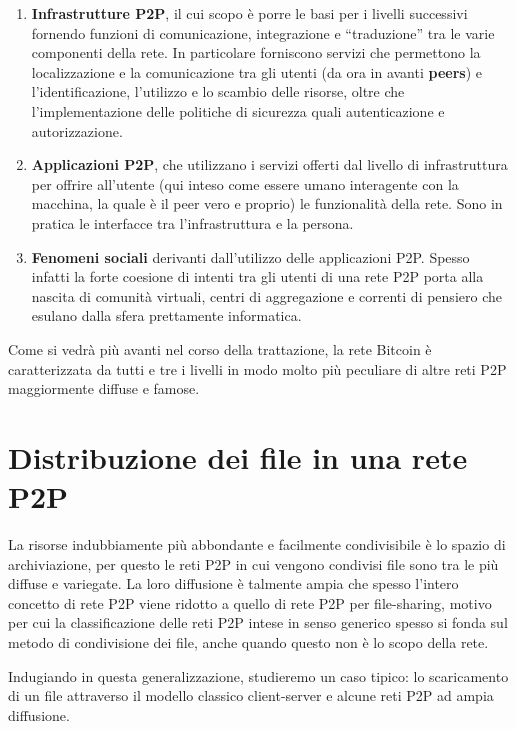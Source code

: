\begin{enumerate}
\def\labelenumi{\arabic{enumi}.}
\item
  \textbf{Infrastrutture P2P}, il cui scopo è porre le basi per i
  livelli successivi fornendo funzioni di comunicazione, integrazione e
  ``traduzione'' tra le varie componenti della rete. In particolare
  forniscono servizi che permettono la localizzazione e la comunicazione
  tra gli utenti (da ora in avanti \textbf{peers}) e l'identificazione,
  l'utilizzo e lo scambio delle risorse, oltre che l'implementazione
  delle politiche di sicurezza quali autenticazione e autorizzazione.
\item
  \textbf{Applicazioni P2P}, che utilizzano i servizi offerti dal
  livello di infrastruttura per offrire all'utente (qui inteso come
  essere umano interagente con la macchina, la quale è il peer vero e
  proprio) le funzionalità della rete. Sono in pratica le interfacce tra
  l'infrastruttura e la persona.
\item
  \textbf{Fenomeni sociali} derivanti dall'utilizzo delle applicazioni
  P2P. Spesso infatti la forte coesione di intenti tra gli utenti di una
  rete P2P porta alla nascita di comunità virtuali, centri di
  aggregazione e correnti di pensiero che esulano dalla sfera
  prettamente informatica.
\end{enumerate}

Come si vedrà più avanti nel corso della trattazione, la rete Bitcoin è
caratterizzata da tutti e tre i livelli in modo molto più peculiare di
altre reti P2P maggiormente diffuse e famose.

\section{Distribuzione dei file in una rete
P2P}\label{distribuzione-dei-file-in-una-rete-p2p}

La risorse indubbiamente più abbondante e facilmente condivisibile è lo
spazio di archiviazione, per questo le reti P2P in cui vengono condivisi
file sono tra le più diffuse e variegate. La loro diffusione è talmente
ampia che spesso l'intero concetto di rete P2P viene ridotto a quello di
rete P2P per file-sharing, motivo per cui la classificazione delle reti
P2P intese in senso generico spesso si fonda sul metodo di condivisione
dei file, anche quando questo non è lo scopo della rete.

Indugiando in questa generalizzazione, studieremo un caso tipico: lo
scaricamento di un file attraverso il modello classico client-server e
alcune reti P2P ad ampia diffusione.

